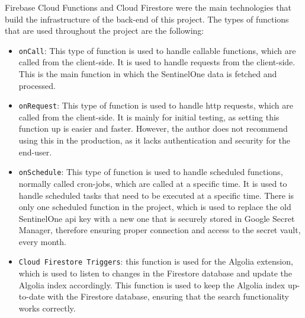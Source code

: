 
Firebase Cloud Functions and Cloud Firestore were the main technologies that build the infrastructure of the back-end of this project.
The types of functions that are used throughout the project are the following:
\begin{itemize}
  \item \texttt{onCall}: This type of function is used to handle callable functions, which are called from the client-side. It is used
        to handle requests from the client-side. This is the main function in which the SentinelOne data is fetched and processed.
  \item \texttt{onRequest}: This type of function is used to handle \acrshort{http} requests, which are called from the client-side.
        It is mainly for initial testing, as setting this function up is easier and faster. However, the author does not recommend
        using this in the production, as it lacks authentication and security for the end-user.
  \item \texttt{onSchedule}: This type of function is used to handle scheduled functions, normally called cron-jobs, which are called
        at a specific time. It is used to handle scheduled tasks that need to be executed at a specific time. There is only one
        scheduled function in the project, which is used to replace the old SentinelOne \acrshort{api} key with a new one that is
        securely stored in Google Secret Manager, therefore ensuring proper connection and access to the secret vault, every month.
  \item \texttt{Cloud Firestore Triggers}: this function is used for the Algolia extension, which is used to listen to changes in the
        Firestore database and update the Algolia index accordingly. This function is used to keep the Algolia index up-to-date with
        the Firestore database, ensuring that the search functionality works correctly.
\end{itemize}


